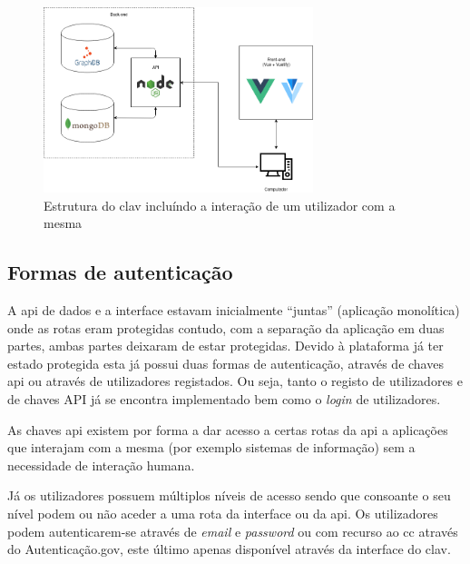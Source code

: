 \begin{figure}[H]
    \begin{center}
        \includegraphics[width=0.7\textwidth]{img/clav_struct.png}
    \end{center}
    \caption{Estrutura do \acrshort{clav} incluíndo a interação de um utilizador com a mesma}\label{fig:clav_struct}
\end{figure}

\subsection{Formas de autenticação}\label{sec:autenticacao}
A \acrshort{api} de dados e a interface estavam inicialmente ``juntas'' (aplicação monolítica) onde as rotas eram protegidas contudo, com a separação da aplicação em duas partes, ambas partes deixaram de estar protegidas. Devido à plataforma já ter estado protegida esta já possui duas formas de autenticação, através de chaves \acrshort{api} ou através de utilizadores registados. Ou seja, tanto o registo de utilizadores e de chaves API já se encontra implementado bem como o \textit{login} de utilizadores.

As chaves \acrshort{api} existem por forma a dar acesso a certas rotas da \acrshort{api} a aplicações que interajam com a mesma (por exemplo sistemas de informação) sem a necessidade de interação humana.

Já os utilizadores possuem múltiplos níveis de acesso sendo que consoante o seu nível podem ou não aceder a uma rota da interface ou da \acrshort{api}. Os utilizadores podem autenticarem-se através de \textit{email} e \textit{password} ou com recurso ao \acrfull{cc} através do Autenticação.gov, este último apenas disponível através da interface do \acrshort{clav}.

